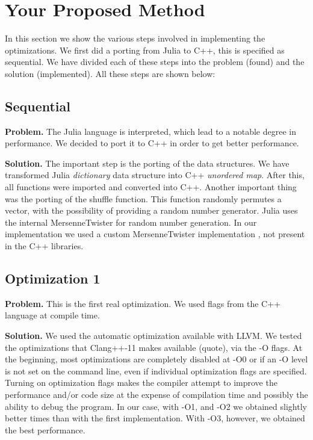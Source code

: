 \documentclass[conference]{IEEEtran}
\newcommand{\mypar}[1]{{\bf #1.}}
\begin{document}
\section{Your Proposed Method}\label{sec:yourmethod}
In this section we show the various steps involved in implementing the optimizations. We first did a porting from Julia to C++, this is specified as sequential. We have divided each of these steps into the problem (found) and the solution (implemented). All these steps are shown below:
\subsection{Sequential}
\mypar{Problem} 
The Julia language is interpreted, which lead to a notable degree in performance. We decided to port it to C++ in order to get better performance.

\mypar{Solution}
The important step is the porting of the data structures. We have transformed Julia \textit{dictionary} data structure into C++ \textit{unordered map}. After this, all functions were imported and converted into C++. 
Another important thing was the porting of the shuffle function. This function randomly permutes a vector, with the possibility of providing a random number generator. Julia uses the internal MersenneTwister \cite{MarsenneTwister} for random number generation. In our implementation we used a custom MersenneTwister implementation \cite{threadSafeMarsenneTwister}, not present in the C++ libraries.

\subsection{Optimization 1}
\mypar{Problem}
This is the first real optimization. We used flags from the C++ language at compile time. 

\mypar{Solution}
We used the automatic optimization available with LLVM. We tested the optimizations that Clang++-11 makes available (quote), via the -O flags. At the beginning, most optimizations are completely disabled at -O0 or if an -O level is not set on the command line, even if individual optimization flags are specified. Turning on optimization flags makes the compiler attempt to improve the performance and/or code size at the expense of compilation time and possibly the ability to debug the program.
In our case, with -O1, and -O2 we obtained slightly better times than with the first implementation. With -O3, however, we obtained the best performance.
\end{document}
